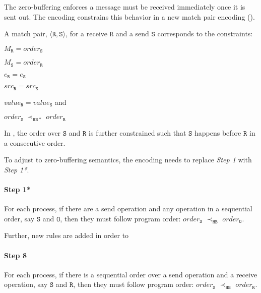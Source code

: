 The zero-buffering enforces a message must be received immediately once it is sent out. The encoding constrains this behavior in a new match pair encoding (). 

\begin{definition} \label{def:match*}
A match pair, $\langle\mathtt{R}, \mathtt{S}\rangle$, for a receive
$\mathtt{R}$ and a send $\mathtt{S}$ corresponds to the constraints:
\begin{compactenum}
\item $M_{\mathtt{R}} = \mathit{order}_{\mathtt{S}}$
\item $M_{\mathtt{S}} = \mathit{order}_{\mathtt{R}}$
\item $e_{\mathtt{R}} = e_{\mathtt{S}}$
\item $src_\mathtt{R} = src_\mathtt{S}$
\item $\mathit{value}_{\mathtt{R}} = \mathit{value}_{\mathtt{S}}$ and
\item $\mathit{order}_{\mathtt{S}}\ \mathrm{\prec_\mathtt{HB*}}\ \mathit{order}_{\mathtt{R}}$
\end{compactenum}
\end{definition}

In , the order over $\mathtt{S}$ and $\mathtt{R}$ is further constrained such that $\mathtt{S}$ happens before $\mathtt{R}$ in a consecutive order.


To adjust to zero-buffering semantics, the encoding needs to replace \emph{Step 1} with \emph{Step 1*}.

\paragraph*{Step 1*} For each process, if there are a send operation and any operation in a sequential order, say $\mathtt{S}$ and $\mathtt{O}$, then 
they must follow program order: $\mathit{order}_\mathtt{S}$
$\prec_\mathtt{HB}$ $\mathit{order}_\mathtt{O}$. 

Further, new rules are added in order to 

\paragraph*{Step 8} For each process, if there is a sequential order over a send operation and a receive operation, say $\mathtt{S}$ and $\mathtt{R}$, then they must follow program order: 
$\mathit{order}_\mathtt{S}$
$\prec_\mathtt{HB}$ $\mathit{order}_\mathtt{R}$.

